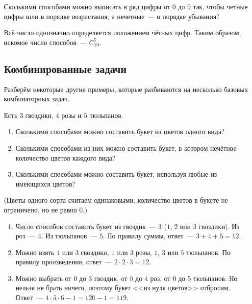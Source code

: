 \begin{Exercise}[counter=SecExercise, label={exercise:combinatorics:odd_even_monotonic}]
    \noindent
    Сколькими способами можно выписать в ряд цифры от $ 0 $ до $ 9 $ так,
    чтобы четные цифры шли в порядке возрастания,
    а нечетные~--- в порядке убывания?
\end{Exercise}

\begin{Answer}
    \noindent
    Всё число однозначно определяется положением чётных цифр.
    Таким образом, искомое число способов~--- $ C_{10}^5 $.
\end{Answer}




\subsection{Комбинированные задачи}
\label{subsec:combinatorics:combined}

Разберём некоторые другие примеры, которые разбиваются на несколько базовых комбинаторных задач.

\begin{Exercise}[counter=SecExercise, label={exercise:combinatorics:flowers}]
    \noindent
    Есть $ 3 $ гвоздики, $ 4 $ розы и $ 5 $ тюльпанов.
    \begin{enumerate}[label=\textbf{\alph*)}]
        \item Сколькими способами можно составить букет из цветов одного вида?
        \item Сколькими способами из них можно составить букет, в котором нечётное количество цветов каждого вида?
        \item Сколькими способами можно составить букет, используя любые из имеющихся цветов?
    \end{enumerate}
    (Цветы одного сорта считаем одинаковыми,
     количество цветов в букете не ограничено, но не равно $ 0 $.)
\end{Exercise}

\begin{Answer}
    \noindent
    \begin{enumerate}[label=\textbf{\alph*)}]
        \item
            Число способов составить букет из гвоздик~--- $ 3 $ ($ 1 $, $ 2 $ или $ 3 $ гвоздики).
            Из роз~--- $ 4 $.
            Из тюльпанов~--- $ 5 $.
            По правилу суммы, ответ~--- $ 3 + 4 + 5 = 12 $.
        \item
            Можно взять $ 1 $ или $ 3 $ гвоздики, $ 1 $ или $ 3 $ розы, $ 1 $, $ 3 $ или $ 5 $ тюльпанов.
            По правилу произведения, ответ~--- $ 2 \cdot 2 \cdot 3 = 12 $.
        \item
            Можно выбрать от $ 0 $ до $ 3 $ гвоздик, от $ 0 $ до $ 4 $ роз, от $ 0 $ до $ 5 $ тюльпанов.
            Но нельзя не брать ничего, поэтому букет <<из нуля цветов>> отбросим.
            Ответ~--- $ 4 \cdot 5 \cdot 6 - 1 = 120 - 1 = 119 $.
    \end{enumerate}
\end{Answer}


